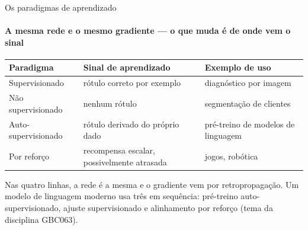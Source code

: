 \documentclass[aspectratio=169, 11pt]{beamer}
\begin{document}
\begin{frame}{Os paradigmas de aprendizado}
  \framesubtitle{A mesma rede e o mesmo gradiente — o que muda é de onde vem o sinal}

  \begin{center}\footnotesize
  \begin{tabular}{@{}lp{4.1cm}p{4.1cm}@{}}
    \toprule
    \textbf{Paradigma} & \textbf{Sinal de aprendizado} & \textbf{Exemplo de uso}\\
    \midrule
    Supervisionado & rótulo correto por exemplo & diagnóstico por imagem\\
    Não supervisionado & nenhum rótulo & segmentação de clientes\\
    Auto-supervisionado & rótulo derivado do próprio dado & pré-treino de modelos de linguagem\\
    Por reforço & recompensa escalar, possivelmente atrasada & jogos, robótica\\
    \bottomrule
  \end{tabular}
  \end{center}

  \begin{ideiabox}
    Nas quatro linhas, a rede é a mesma e o gradiente vem por retropropagação.
    Um modelo de linguagem moderno usa três em sequência: pré-treino
    auto-supervisionado, ajuste supervisionado e alinhamento por reforço
    (tema da disciplina GBC063).
  \end{ideiabox}
\end{frame}
\end{document}
